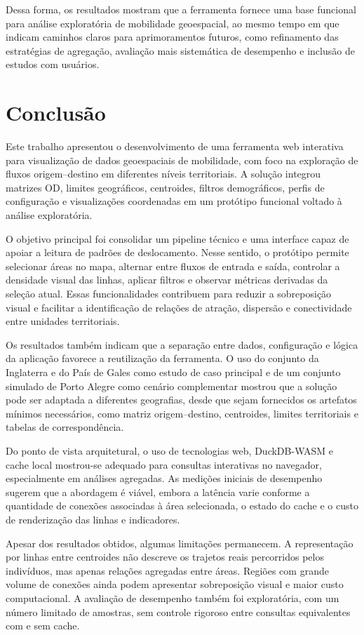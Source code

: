\documentclass[12pt]{article}
\begin{document}
Dessa forma, os resultados mostram que a ferramenta fornece uma base funcional para análise exploratória de mobilidade geoespacial, ao mesmo tempo em que indicam caminhos claros para aprimoramentos futuros, como refinamento das estratégias de agregação, avaliação mais sistemática de desempenho e inclusão de estudos com usuários.

\section{Conclusão}

Este trabalho apresentou o desenvolvimento de uma ferramenta web interativa para visualização de dados geoespaciais de mobilidade, com foco na exploração de fluxos origem--destino em diferentes níveis territoriais. A solução integrou matrizes OD, limites geográficos, centroides, filtros demográficos, perfis de configuração e visualizações coordenadas em um protótipo funcional voltado à análise exploratória.

O objetivo principal foi consolidar um pipeline técnico e uma interface capaz de apoiar a leitura de padrões de deslocamento. Nesse sentido, o protótipo permite selecionar áreas no mapa, alternar entre fluxos de entrada e saída, controlar a densidade visual das linhas, aplicar filtros e observar métricas derivadas da seleção atual. Essas funcionalidades contribuem para reduzir a sobreposição visual e facilitar a identificação de relações de atração, dispersão e conectividade entre unidades territoriais.

Os resultados também indicam que a separação entre dados, configuração e lógica da aplicação favorece a reutilização da ferramenta. O uso do conjunto da Inglaterra e do País de Gales como estudo de caso principal e de um conjunto simulado de Porto Alegre como cenário complementar mostrou que a solução pode ser adaptada a diferentes geografias, desde que sejam fornecidos os artefatos mínimos necessários, como matriz origem--destino, centroides, limites territoriais e tabelas de correspondência.

Do ponto de vista arquitetural, o uso de tecnologias web, DuckDB-WASM e cache local mostrou-se adequado para consultas interativas no navegador, especialmente em análises agregadas. As medições iniciais de desempenho sugerem que a abordagem é viável, embora a latência varie conforme a quantidade de conexões associadas à área selecionada, o estado do cache e o custo de renderização das linhas e indicadores.

Apesar dos resultados obtidos, algumas limitações permanecem. A representação por linhas entre centroides não descreve os trajetos reais percorridos pelos indivíduos, mas apenas relações agregadas entre áreas. Regiões com grande volume de conexões ainda podem apresentar sobreposição visual e maior custo computacional. A avaliação de desempenho também foi exploratória, com um número limitado de amostras, sem controle rigoroso entre consultas equivalentes com e sem cache.
\end{document}

